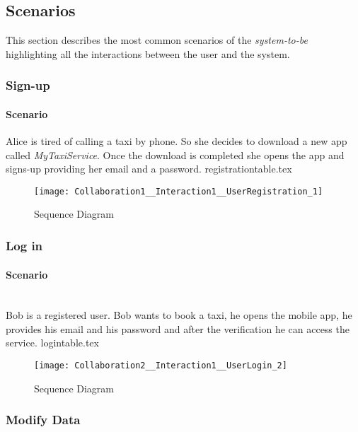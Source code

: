 
\subsection{Scenarios}
\label{sec:scenarios}
This section describes the most common scenarios of the \emph{system-to-be} highlighting all the interactions between the user and the system.

\subsubsection{Sign-up} 
\label{ssub:sign_up_scenario}
\paragraph{Scenario} 
Alice is tired of calling a taxi by phone. So she decides to download a new app called \emph{MyTaxiService}.
Once the download is completed she opens the app and signs-up providing her email and a password.
\newpage
\vfill
{registrationtable.tex}
\vfill
\clearpage
\newpage
\vfill
\begin{figure}
\caption{Sequence Diagram}
\texttt{[image: Collaboration1\_\_Interaction1\_\_UserRegistration\_1]}
\centering
\end{figure}
\vfill
\clearpage


\subsubsection{Log in} 
\label{ssub:login_scenario}
\paragraph{Scenario} \hfill \\
Bob is a registered user. Bob wants to book a taxi, he opens the mobile app, he provides his email and his password and after the verification he can access the service.
{logintable.tex}
\newpage
\vfill
\begin{figure}
\caption{Sequence Diagram}
\texttt{[image: Collaboration2\_\_Interaction1\_\_UserLogin\_2]}
\centering
\end{figure}
\vfill
\clearpage

\subsubsection{Modify Data} 
\label{ssub:modify_scenario}
